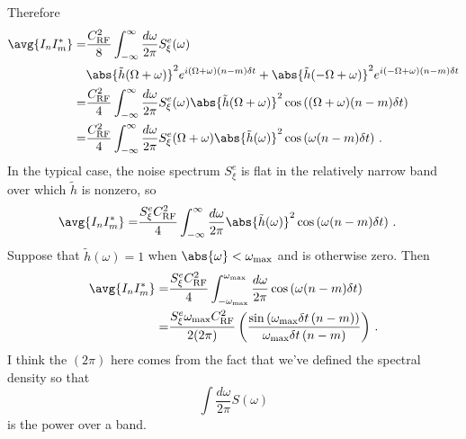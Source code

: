 Therefore
\begin{align}
  \avg{I_n I_m^*}
  =& \frac{C_\text{RF}^2}{8}
    \int_{-\infty}^\infty \frac{d\omega}{2\pi} S_{\xi}^e(\omega) \\ \nonumber
  & \abs{\tilde{h}(\Omega + \omega)}^2 e^{i (\Omega + \omega) (n - m) \delta t}
  + \abs{\tilde{h}(-\Omega + \omega)}^2 e^{i (-\Omega + \omega) (n - m) \delta t}
  \nonumber \\
  =& \frac{C_\text{RF}^2}{4}
    \int_{-\infty}^\infty \frac{d\omega}{2\pi} S_{\xi}^e(\omega)
    \abs{\tilde{h}(\Omega + \omega)}^2 \cos \left((\Omega + \omega) (n - m) \delta t \right)
    \nonumber \\
  =& \frac{C_\text{RF}^2}{4}
    \int_{-\infty}^\infty \frac{d\omega}{2\pi} S_{\xi}^e(\Omega + \omega)
    \abs{\tilde{h}(\omega)}^2 \cos \left(\omega (n - m) \delta t \right)
  \, .
\end{align}
In the typical case, the noise spectrum $S_\xi^e$ is flat in the relatively narrow band over which $\tilde{h}$ is nonzero, so
\begin{align}
  \avg{I_n I_m^*}
  =& \frac{S_\xi^e C_\text{RF}^2}{4}
    \int_{-\infty}^\infty \frac{d\omega}{2\pi} \abs{\tilde{h}(\omega)}^2 \cos \left(\omega (n - m) \delta t \right)
  \, .
\end{align}
Suppose that $\tilde{h}(\omega) = 1$ when $\abs{\omega} < \omega_\text{max}$ and is otherwise zero.
Then
\begin{align}
  \avg{I_n I_m^*}
  =& \frac{S_\xi^e C_\text{RF}^2}{4}
    \int_{-\omega_\text{max}}^{\omega_\text{max}} \frac{d\omega}{2\pi} \cos \left(\omega (n - m) \delta t \right)
    \nonumber \\
  =& \frac{S_\xi^e \omega_\text{max} C_\text{RF}^2}{2 (2\pi)}
    \left( \frac{\sin \left( \omega_\text{max} \delta t \, (n - m) \right)}{\omega_\text{max} \delta t \, (n - m)} \right)
  \, .
\end{align}
I think the $(2\pi)$ here comes from the fact that we've defined the spectral density so that
\begin{equation}
  \int \frac{d\omega}{2\pi} S(\omega)
\end{equation}
is the power over a band.
